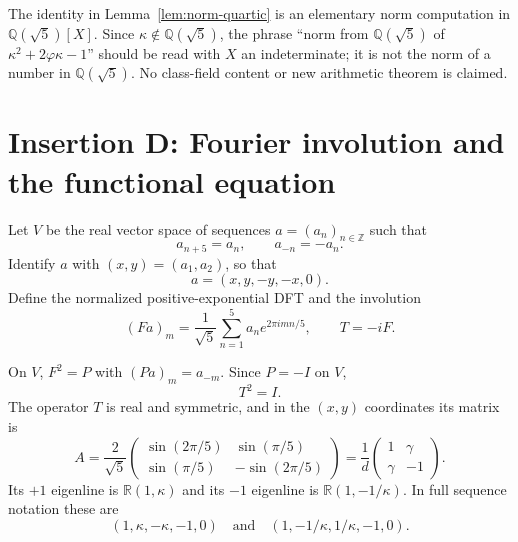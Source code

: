 \begin{remark}\label{rem:norm-elementary}
The identity in Lemma~\ref{lem:norm-quartic} is an elementary norm computation in \(\mathbb Q(\sqrt5)[X]\). Since \(\kappa\notin\mathbb Q(\sqrt5)\), the phrase ``norm from \(\mathbb Q(\sqrt5)\) of \(\kappa^2+2\varphi\kappa-1\)'' should be read with \(X\) an indeterminate; it is not the norm of a number in \(\mathbb Q(\sqrt5)\). No class-field content or new arithmetic theorem is claimed.
\end{remark}

\section*{Insertion D: Fourier involution and the functional equation}

\begin{definition}\label{def:V5}
Let \(V\) be the real vector space of sequences \(a=(a_n)_{n\in\mathbb Z}\) such that
\[
a_{n+5}=a_n,\qquad a_{-n}=-a_n.
\]
Identify \(a\) with \((x,y)=(a_1,a_2)\), so that
\[
a=(x,y,-y,-x,0).
\]
Define the normalized positive-exponential DFT and the involution
\[
(Fa)_m=\frac1{\sqrt5}\sum_{n=1}^5 a_n e^{2\pi i mn/5},
\qquad
T=-iF.
\]
\end{definition}

\begin{lemma}\label{lem:fourier-involution}
On \(V\), \(F^2=P\) with \((Pa)_m=a_{-m}\). Since \(P=-I\) on \(V\),
\[
T^2=I.
\]
The operator \(T\) is real and symmetric, and in the \((x,y)\) coordinates its matrix is
\[
A=\frac2{\sqrt5}
\begin{pmatrix}
\sin(2\pi/5)&\sin(\pi/5)\\
\sin(\pi/5)&-\sin(2\pi/5)
\end{pmatrix}
=\frac1d\begin{pmatrix}1&\gamma\\ \gamma&-1\end{pmatrix}.
\]
Its \(+1\) eigenline is \(\mathbb R(1,\kappa)\) and its \(-1\) eigenline is \(\mathbb R(1,-1/\kappa)\). In full sequence notation these are
\[
(1,\kappa,-\kappa,-1,0)
\quad\text{and}\quad
(1,-1/\kappa,1/\kappa,-1,0).
\]
\end{lemma}

